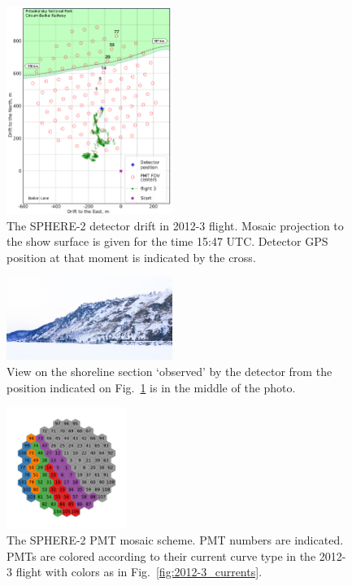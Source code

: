 \documentclass[final,5p,times,twocolumn]{elsarticle}
\begin{document}
\begin{figure}[tb]
    \includegraphics[width=0.48\textwidth]{2012_drift-mod.pdf}
    \caption{The SPHERE-2 detector drift in 2012-3 flight. Mosaic projection to the show surface is given for the time 15:47 UTC. Detector GPS position at that moment is indicated by the cross.}
    \label{fig:2012-drift}
\end{figure}

\begin{figure}[tb]
    \includegraphics[width=0.48\textwidth]{DSC_7256_1.jpg}
    \caption{View on the shoreline section `observed' by the detector from the position indicated on Fig.~\ref{fig:2012-drift} is in the middle of the photo.}
    \label{fig:2012--shore-view}
\end{figure}



\begin{figure}[tb]
\centering
    \includegraphics[width=0.35\textwidth]{2012-3_retina_all.pdf}
    \caption{The SPHERE-2 PMT mosaic scheme. PMT numbers are indicated. PMTs are colored according to their current curve type in the 2012-3 flight with colors as in Fig.~\ref{fig:2012-3_currents}.}
    \label{fig:2012-3_shore_image}
\end{figure}
\end{document}
